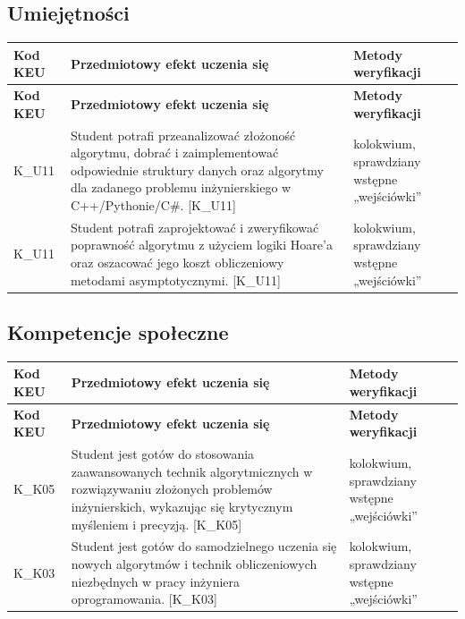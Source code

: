 \documentclass[12pt, a4paper]{article}
\newcommand{\thdrule}{\noalign{\global\setlength{\extrarowheight}{0pt}}}
\newcommand{\thdend}{\noalign{\global\setlength{\extrarowheight}{3pt}}}
\begin{document}
\subsection*{Umiejętności}
{\scriptsize
\begin{longtable}{m{1.6cm}m{9.0cm}m{4.2cm}}
\thdrule\toprule
\rowcolor{pjatkRed} {\color{white}\footnotesize\textbf{\vphantom{Ag}Kod KEU}} & {\color{white}\footnotesize\textbf{\vphantom{Ag}Przedmiotowy efekt uczenia się}} & {\color{white}\footnotesize\textbf{\vphantom{Ag}Metody weryfikacji}} \\
\midrule\thdend
\endfirsthead
\thdrule\toprule
\rowcolor{pjatkRed} {\color{white}\footnotesize\textbf{\vphantom{Ag}Kod KEU}} & {\color{white}\footnotesize\textbf{\vphantom{Ag}Przedmiotowy efekt uczenia się}} & {\color{white}\footnotesize\textbf{\vphantom{Ag}Metody weryfikacji}} \\
\midrule\thdend
\endhead
  \rowcolor{tableRowLight} K\_U11 & Student potrafi przeanalizować złożoność algorytmu, dobrać i zaimplementować odpowiednie struktury danych oraz algorytmy dla zadanego problemu inżynierskiego w C++/Pythonie/C\#. {[}K\_U11{]} & kolokwium, sprawdziany wstępne „wejściówki'' \\
  \rowcolor{tableRowAlt} K\_U11 & Student potrafi zaprojektować i zweryfikować poprawność algorytmu z użyciem logiki Hoare'a oraz oszacować jego koszt obliczeniowy metodami asymptotycznymi. {[}K\_U11{]} & kolokwium, sprawdziany wstępne „wejściówki'' \\
\bottomrule
\end{longtable}}

\subsection*{Kompetencje społeczne}
{\scriptsize
\begin{longtable}{m{1.6cm}m{9.0cm}m{4.2cm}}
\thdrule\toprule
\rowcolor{pjatkRed} {\color{white}\footnotesize\textbf{\vphantom{Ag}Kod KEU}} & {\color{white}\footnotesize\textbf{\vphantom{Ag}Przedmiotowy efekt uczenia się}} & {\color{white}\footnotesize\textbf{\vphantom{Ag}Metody weryfikacji}} \\
\midrule\thdend
\endfirsthead
\thdrule\toprule
\rowcolor{pjatkRed} {\color{white}\footnotesize\textbf{\vphantom{Ag}Kod KEU}} & {\color{white}\footnotesize\textbf{\vphantom{Ag}Przedmiotowy efekt uczenia się}} & {\color{white}\footnotesize\textbf{\vphantom{Ag}Metody weryfikacji}} \\
\midrule\thdend
\endhead
  \rowcolor{tableRowLight} K\_K05 & Student jest gotów do stosowania zaawansowanych technik algorytmicznych w rozwiązywaniu złożonych problemów inżynierskich, wykazując się krytycznym myśleniem i precyzją. {[}K\_K05{]} & kolokwium, sprawdziany wstępne „wejściówki'' \\
  \rowcolor{tableRowAlt} K\_K03 & Student jest gotów do samodzielnego uczenia się nowych algorytmów i technik obliczeniowych niezbędnych w pracy inżyniera oprogramowania. {[}K\_K03{]} & kolokwium, sprawdziany wstępne „wejściówki'' \\
\bottomrule
\end{longtable}}
\end{document}

